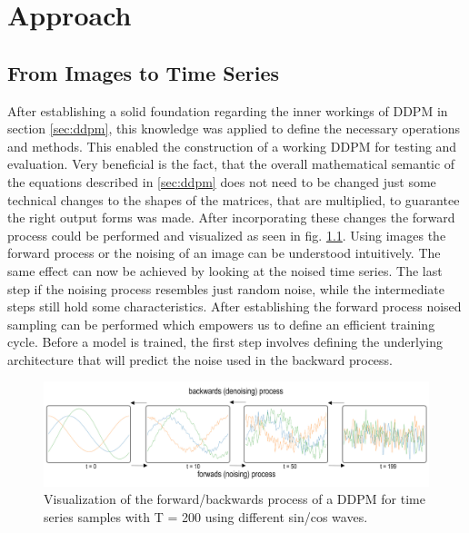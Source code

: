 \chapter{Approach}
\label{sec:approach}
\section{From Images to Time Series}
\label{sec:from images to time series}
After establishing a solid foundation regarding the inner workings of DDPM in section \ref{sec:ddpm}, this knowledge was applied to define the necessary operations and methods. This enabled the construction of a working DDPM for testing and evaluation.\newline
Very beneficial is the fact, that the overall mathematical semantic of the equations described in \ref{sec:ddpm} does not need to be changed
just some technical changes to the shapes of the matrices, that are multiplied, to guarantee the right output forms was made.
After incorporating these changes the forward process could be performed and visualized as seen in fig. \ref{fig:time series ddpm process}.
Using images the forward process or the noising of an image can be understood intuitively. The same effect can now be achieved by looking at the
noised time series. The last step if the noising process resembles just random noise, while the intermediate steps still hold some characteristics.\newline
After establishing the forward process noised sampling can be performed which empowers us to define an 
efficient training cycle. Before a model is trained, the first step involves defining the underlying architecture that will predict the noise used in the backward process.
\begin{figure}
    \centering
    \includegraphics[width=\textwidth]{images/noised time series.jpg}
    \caption{Visualization of the forward/backwards process of a DDPM for time series samples with T = 200 using different sin/cos waves.}
    \label{fig:time series ddpm process}
\end{figure}
